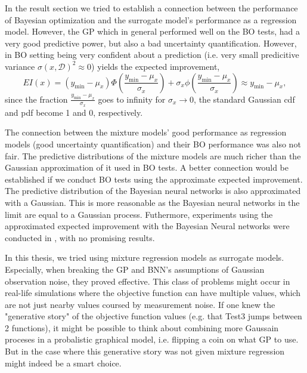 In the result section we tried to establish a connection between the performance of Bayesian optimization and the surrogate
model's performance as a regression model. However, the GP which in general performed well on the BO tests, had a very
good predictive power, but also a bad uncertainty quantification. However, in BO setting being very confident about a 
prediction (i.e. very small predicitive variance $\sigma(x,\mathcal{D})^2 \approx 0$) yields the expected improvement, 
$$EI(x) = (y_{\min}-\mu_x)\Phi\left(\frac{y_{\min}-\mu_x}{\sigma_x}\right)+ \sigma_x
\phi\left(\frac{y_{\min}-\mu_x}{\sigma_x}\right) \approx y_{\min}-\mu_x,$$ since the fraction
$\frac{y_{\min}-\mu_x}{\sigma_x}$ goes to infinity for $\sigma_x \rightarrow 0$, the standard
Gaussian cdf and pdf become 1 and 0, respectively. 

The connection between the mixture models' good performance as regression models (good
uncertainty quantification) and their BO performance was also not fair. The predictive distributions
of the mixture models are much richer than the Gaussian approximation of it used in BO tests. 
A better connection would be established if we conduct BO tests using the approximate expected
improvement. The predictive distribution of the Bayesian neural networks is also approximated with a
Gaussian. This is more reasonable as the Bayesian neural networks in the limit are equal to a
Gaussian process. Futhermore, experiments using the approximated expected improvement with the
Bayesian Neural networks were conducted in \cite{PhDthesis}, with no promising results. 




In this thesis, we tried using mixture regression models as surrogate models. Especially, when breaking the 
GP and BNN's assumptions of Gaussian observation noise, they proved effective. This class of problems
might occur in real-life simulations where the objective function can have multiple values, which are not
just nearby values coursed by measurement noise. If one knew the "generative story" of the
objective function values (e.g. that Test3 jumps between 2 functions), it might be possible to think about combining more Gaussain proceses in a probalistic
graphical model, i.e. flipping a coin on what GP to use. But in the case where this generative story was not given 
mixture regression might indeed be a smart choice. 

